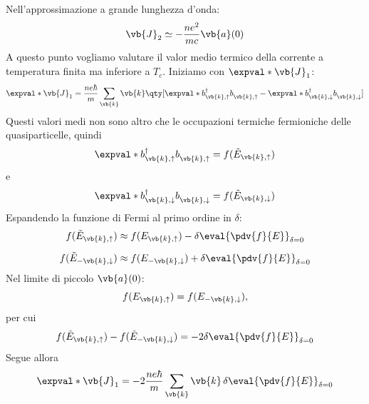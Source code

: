 Nell'approssimazione a grande lunghezza d'onda:
\begin{equation*}
   \vb{J}_2
   \simeq
   -
   \frac{ne^2}{mc}
   \vb{a}(0)
\end{equation*}
A questo punto vogliamo valutare il valor medio termico della corrente a temperatura finita ma inferiore a $T_c$. Iniziamo con $\expval*{\vb{J}_1}$:
\begin{equation*}
   \expval*{\vb{J}_1}
   =
   \frac{ne\hbar}{m}
   \sum_{\vb{k}}
   \vb{k}
   \qty[
      \expval*{
         b^{\dag}_{\vb{k},\uparrow}
         b^{\vphantom{\dag}}_{\vb{k},\uparrow}
      }
      -
      \expval*{
         b^{\dag}_{\vb{k},\downarrow}
         b^{\vphantom{\dag}}_{\vb{k},\downarrow}
      }
   ]
\end{equation*}
Questi valori medi non sono altro che le occupazioni termiche fermioniche delle quasiparticelle, quindi
\begin{equation*}
   \expval*{
      b^{\dag}_{\vb{k},\uparrow}
      b^{\vphantom{\dag}}_{\vb{k},\uparrow}
   }
   =
   f(\tilde{E}_{\vb{k},\uparrow})
\end{equation*}
e
\begin{equation*}
   \expval*{
      b^{\dag}_{\vb{k},\downarrow}
      b^{\vphantom{\dag}}_{\vb{k},\downarrow}
   }
   =
   f(\tilde{E}_{\vb{k},\downarrow})
\end{equation*}
Espandendo la funzione di Fermi al primo ordine in $\delta$:
\begin{equation*}
   \begin{split}
      f(\tilde{E}_{\vb{k},\uparrow})
      &\approx
      f(E_{\vb{k},\uparrow})
      -
      \delta
      \eval{\pdv{f}{E}}_{\delta=0}
      \\[0.2cm]
      f(\tilde{E}_{-\vb{k},\downarrow})
      &\approx
      f(E_{-\vb{k},\downarrow})
      +
      \delta
      \eval{\pdv{f}{E}}_{\delta=0}
   \end{split}
\end{equation*}
Nel limite di piccolo $\vb{a}(0)$:
\begin{equation*}
   f(E_{\vb{k},\uparrow})
   =
   f(E_{-\vb{k},\downarrow}),
\end{equation*}
per cui
\begin{equation*}
   f(\tilde{E}_{\vb{k},\uparrow})
   -
   f(\tilde{E}_{-\vb{k},\downarrow})
   =
   -2\delta
   \eval{\pdv{f}{E}}_{\delta=0}
\end{equation*}
Segue allora
\begin{equation*}
   \expval*{\vb{J}_1}
   =
   -2
   \frac{ne\hbar}{m}
   \sum_{\vb{k}}
   \vb{k}
   \,
   \delta
   \eval{\pdv{f}{E}}_{\delta=0}
\end{equation*}
